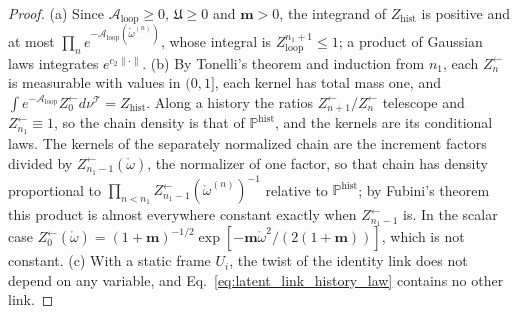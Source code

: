 \begin{proof}
(a) Since $\mathcal A_{\mathrm{loop}}\geq0$, $\mathfrak U\geq0$ and $\mathbf m>0$, the integrand of $Z_{\mathrm{hist}}$ is positive and at most $\prod_ne^{-\mathcal A_{\mathrm{loop}}(\mathring\omega^{(n)})}$, whose integral is $Z_{\mathrm{loop}}^{n_1+1}\leq1$; a product of Gaussian laws integrates $e^{c_2\|\cdot\|}$.
(b) By Tonelli's theorem and induction from $n_1$, each $Z^{\leftarrow}_n$ is measurable with values in $(0,1]$, each kernel has total mass one, and $\int e^{-\mathcal A_{\mathrm{loop}}}Z^{\leftarrow}_0d\nu^{\mathcal T}=Z_{\mathrm{hist}}$. Along a history the ratios $Z^{\leftarrow}_{n+1}/Z^{\leftarrow}_n$ telescope and $Z^{\leftarrow}_{n_1}\equiv1$, so the chain density is that of $\mathbb P^{\mathrm{hist}}$, and the kernels are its conditional laws. The kernels of the separately normalized chain are the increment factors divided by $Z^{\leftarrow}_{n_1-1}(\mathring\omega)$, the normalizer of one factor, so that chain has density proportional to $\prod_{n<n_1}Z^{\leftarrow}_{n_1-1}(\mathring\omega^{(n)})^{-1}$ relative to $\mathbb P^{\mathrm{hist}}$; by Fubini's theorem this product is almost everywhere constant exactly when $Z^{\leftarrow}_{n_1-1}$ is. In the scalar case $Z^{\leftarrow}_0(\mathring\omega)=(1+\mathbf m)^{-1/2}\exp[-\mathbf m\mathring\omega^2/(2(1+\mathbf m))]$, which is not constant.
(c) With a static frame $U_i$, the twist of the identity link does not depend on any variable, and Eq.~\eqref{eq:latent_link_history_law} contains no other link.
\end{proof}

